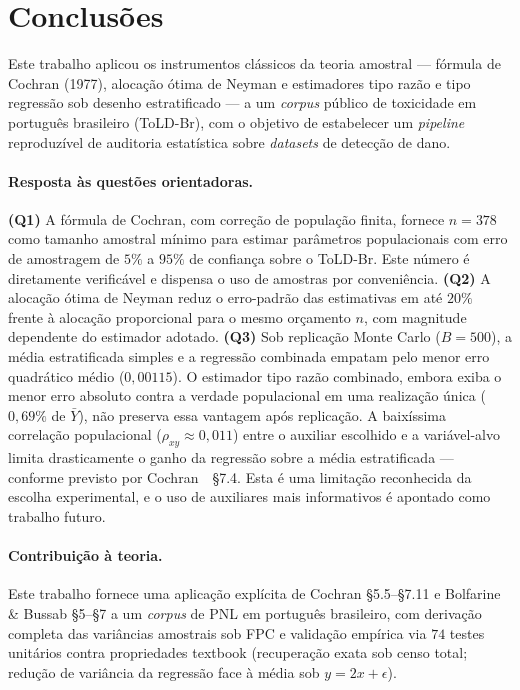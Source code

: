 \section{Conclusões}
\label{sec:conclusion}

Este trabalho aplicou os instrumentos clássicos da teoria amostral
--- fórmula de Cochran (1977), alocação ótima de Neyman e estimadores tipo
razão e tipo regressão sob desenho estratificado --- a um \textit{corpus}
público de toxicidade em português brasileiro (ToLD-Br), com o objetivo de
estabelecer um \textit{pipeline} reproduzível de auditoria estatística sobre
\textit{datasets} de detecção de dano.

\paragraph{Resposta às questões orientadoras.} \textbf{(Q1)} A fórmula de
Cochran, com correção de população finita, fornece $n=378$ como tamanho
amostral mínimo para estimar parâmetros populacionais com erro de amostragem
de $5\%$ a $95\%$ de confiança sobre o ToLD-Br. Este número é diretamente
verificável e dispensa o uso de amostras por conveniência. \textbf{(Q2)} A
alocação ótima de Neyman reduz o erro-padrão das estimativas em até $20\%$
frente à alocação proporcional para o mesmo orçamento $n$, com magnitude
dependente do estimador adotado. \textbf{(Q3)} Sob replicação Monte Carlo ($B=500$), a média estratificada
simples e a regressão combinada empatam pelo menor erro quadrático médio
($0{,}00115$). O estimador tipo razão combinado, embora exiba o menor erro
absoluto contra a verdade populacional em uma realização única ($0{,}69\%$
de $\bar{Y}$), não preserva essa vantagem após replicação. A baixíssima
correlação populacional ($\rho_{xy} \approx 0{,}011$) entre o auxiliar
escolhido e a variável-alvo limita drasticamente o ganho da regressão sobre
a média estratificada --- conforme previsto por Cochran~\cite{cochran1977}~§7.4.
Esta é uma limitação reconhecida da escolha experimental, e o uso de
auxiliares mais informativos é apontado como trabalho futuro.

\paragraph{Contribuição à teoria.} Este trabalho fornece uma aplicação
explícita de Cochran §5.5--§7.11 e Bolfarine \& Bussab §5--§7 a um
\textit{corpus} de PNL em português brasileiro, com derivação completa das
variâncias amostrais sob FPC e validação empírica via $74$ testes unitários
contra propriedades textbook (recuperação exata sob censo total; redução de
variância da regressão face à média sob $y = 2x + \epsilon$).

